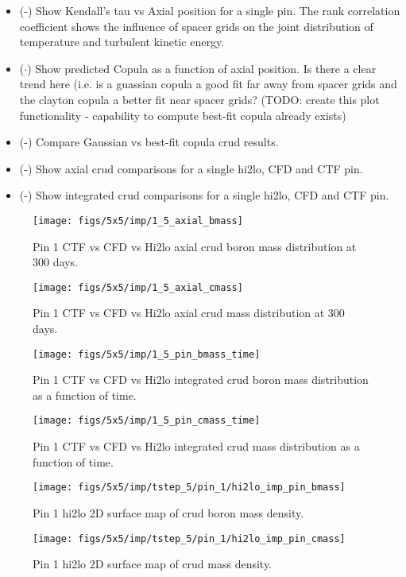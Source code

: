 \begin{itemize}
    \item (\checkmark-) Show Kendall's tau vs Axial position for a single pin.  The rank correlation coefficient shows
    the influence of spacer grids on the joint distribution of temperature and turbulent kinetic energy.
    \item ($\cdot$) Show predicted Copula as a function of axial position.  Is there a clear trend here (i.e. is a guassian copula
    a good fit far away from spacer grids and the clayton copula a better fit near spacer grids?  (TODO: create this plot functionality - capability to compute best-fit copula already exists)
    \item (\checkmark-) Compare Gaussian vs best-fit copula crud results.
    \item (\checkmark-) Show axial crud comparisons for a single hi2lo, CFD and CTF pin.
    \item (\checkmark-) Show integrated crud comparisons for a single hi2lo, CFD and CTF pin.
\end{itemize}

\begin{figure}[H]
    \centering
    \texttt{[image: figs/5x5/imp/1\_5\_axial\_bmass]}
    \caption{Pin 1 CTF vs CFD vs Hi2lo axial crud boron mass distribution at 300 days.}
    \label{fig:15axialbmass}
\end{figure}
\begin{figure}[H]
    \centering
    \texttt{[image: figs/5x5/imp/1\_5\_axial\_cmass]}
    \caption{Pin 1 CTF vs CFD vs Hi2lo axial crud mass distribution at 300 days.}
    \label{fig:15axialcmass}
\end{figure}
\begin{figure}[H]
    \centering
    \texttt{[image: figs/5x5/imp/1\_5\_pin\_bmass\_time]}
    \caption{Pin 1 CTF vs CFD vs Hi2lo integrated crud boron mass distribution as a function of time.}
    \label{fig:15pinbmasstime}
\end{figure}
\begin{figure}[H]
    \centering
    \texttt{[image: figs/5x5/imp/1\_5\_pin\_cmass\_time]}
    \caption{Pin 1 CTF vs CFD vs Hi2lo integrated crud mass distribution as a function of time.}
    \label{fig:15pincmasstime}
\end{figure}

\begin{figure}[H]
    \centering
    \texttt{[image: figs/5x5/imp/tstep\_5/pin\_1/hi2lo\_imp\_pin\_bmass]}
    \caption{Pin 1 hi2lo 2D surface map of crud boron mass density.}
    \label{fig:hi2loimppinbmass}
\end{figure}
\begin{figure}[H]
    \centering
    \texttt{[image: figs/5x5/imp/tstep\_5/pin\_1/hi2lo\_imp\_pin\_cmass]}
    \caption{Pin 1 hi2lo 2D surface map of crud mass density.}
    \label{fig:hi2loimppincmass}
\end{figure}


